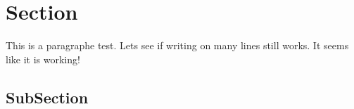 \documentclass[12pt,]{article}
\begin{document}
\section*{Section}

This is a paragraphe test. Lets see if writing on many lines still works. It seems like it is working!

\subsection{SubSection}
\end{document}
